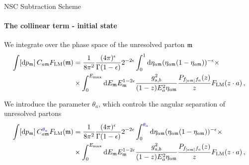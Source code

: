 \begin{frame} {NSC Subtraction Scheme}
  \framesubtitle{The collinear term - initial state}
We integrate over the phase space of the unresolved parton $\mathfrak{m}$ 
\begin{equation*}
  \begin{aligned}
  \int [\mathrm{d}p_{\mathfrak{m}}]\, C_{a\mathfrak{m}}  F_{\mathrm{LM}} (\mathfrak{m}) &= \frac{1}{8\pi^2} \frac{(4\pi)^{\epsilon}}{\Gamma(1-\epsilon)} 2^{-2\epsilon} \int_0^{1} \mathrm{d}\eta_{a\mathfrak{m}} (\eta_{a\mathfrak{m}}(1-\eta_{a\mathfrak{m}}))^{-\epsilon} \times \\
  & \times \int_{0}^{E_{\mathrm{max}}} \mathrm{d}E_{\mathfrak{m}} E_{\mathfrak{m}}^{1-2\epsilon} \frac{g_{s,b}^2}{(1-z)E_a^2 \eta_{a\mathfrak{m}}} \frac{P_{f_{[a\mathfrak{m}]}f_a}(z)}{z} F_{\mathrm{LM}} (z \cdot a) \, ,
  \end{aligned}
\end{equation*}

\pause
We introduce the parameter $\theta_a$, which controls the angular separation of unresolved partons
\begin{equation*}
  \begin{aligned}
  \int [\mathrm{d}p_{\mathfrak{m}}]\, C_{a\mathfrak{m}}^{\textcolor{blue}{\theta_a}}  F_{\mathrm{LM}} (\mathfrak{m}) &= \frac{1}{8\pi^2} \frac{(4\pi)^{\epsilon}}{\Gamma(1-\epsilon)} 2^{-2\epsilon} \int_0^{\textcolor{blue}{\theta_a}} \mathrm{d}\eta_{a\mathfrak{m}} (\eta_{a\mathfrak{m}}(1-\eta_{a\mathfrak{m}}))^{-\epsilon} \times \\
  & \times \int_{0}^{E_{\mathrm{max}}} \mathrm{d}E_{\mathfrak{m}} E_{\mathfrak{m}}^{1-2\epsilon} \frac{g_{s,b}^2}{(1-z)E_a^2 \eta_{a\mathfrak{m}}} \frac{P_{f_{[a\mathfrak{m}]}f_a}(z)}{z} F_{\mathrm{LM}} (z \cdot a) \, ,
  \end{aligned}
\end{equation*}
\end{frame}


